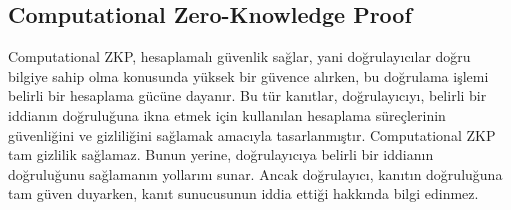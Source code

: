 \newpage

\subsection{Computational Zero-Knowledge Proof}

Computational ZKP, hesaplamalı güvenlik sağlar, yani doğrulayıcılar doğru bilgiye sahip olma konusunda yüksek bir güvence alırken, bu doğrulama işlemi belirli bir hesaplama gücüne dayanır. Bu tür kanıtlar, doğrulayıcıyı, belirli bir iddianın doğruluğuna ikna etmek için kullanılan hesaplama süreçlerinin güvenliğini ve gizliliğini sağlamak amacıyla tasarlanmıştır. Computational ZKP tam gizlilik sağlamaz. Bunun yerine, doğrulayıcıya belirli bir iddianın doğruluğunu sağlamanın yollarını sunar. Ancak doğrulayıcı, kanıtın doğruluğuna tam güven duyarken, kanıt sunucusunun iddia ettiği hakkında bilgi edinmez.

\newpage